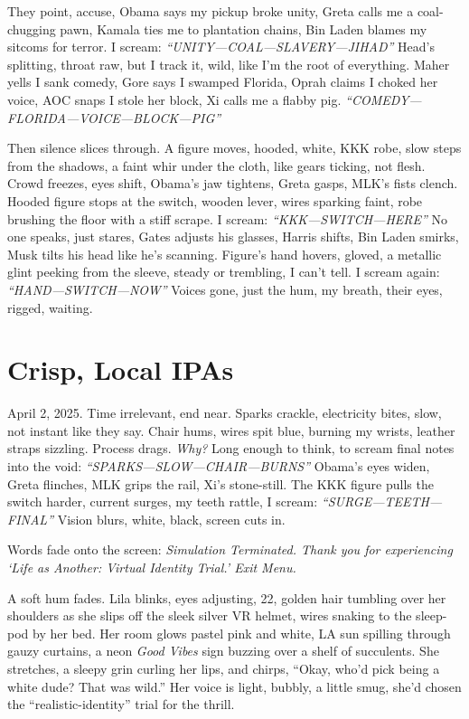 \documentclass[12pt]{article} %
\begin{document}
They point, accuse, \textnormal{Obama} says my pickup broke unity, \textnormal{Greta} calls me a coal-chugging pawn, \textnormal{Kamala} ties me to plantation chains, \textnormal{Bin Laden} blames my sitcoms for terror. I scream: \textit{“UNITY—COAL—SLAVERY—JIHAD”} Head’s splitting, throat raw, but I track it, wild, like I’m the root of everything. \textnormal{Maher} yells I sank comedy, \textnormal{Gore} says I swamped Florida, \textnormal{Oprah} claims I choked her voice, \textnormal{AOC} snaps I stole her block, \textnormal{Xi} calls me a flabby pig. \textit{“COMEDY—FLORIDA—VOICE—BLOCK—PIG”}

Then silence slices through. A figure moves, hooded, white, KKK robe, slow steps from the shadows, a faint whir under the cloth, like gears ticking, not flesh. Crowd freezes, eyes shift, \textnormal{Obama}’s jaw tightens, \textnormal{Greta} gasps, \textnormal{MLK}’s fists clench. Hooded figure stops at the switch, wooden lever, wires sparking faint, robe brushing the floor with a stiff scrape. I scream: \textit{“KKK—SWITCH—HERE”} No one speaks, just stares, \textnormal{Gates} adjusts his glasses, \textnormal{Harris} shifts, \textnormal{Bin Laden} smirks, \textnormal{Musk} tilts his head like he’s scanning. Figure’s hand hovers, gloved, a metallic glint peeking from the sleeve, steady or trembling, I can’t tell. I scream again: \textit{“HAND—SWITCH—NOW”} Voices gone, just the hum, my breath, their eyes, rigged, waiting.

\section{Crisp, Local IPAs}

April 2, 2025. Time irrelevant, end near. Sparks crackle, electricity bites, slow, not instant like they say. Chair hums, wires spit blue, burning my wrists, leather straps sizzling. Process drags. \textit{Why?} Long enough to think, to scream final notes into the void: \textit{“SPARKS—SLOW—CHAIR—BURNS”} \textnormal{Obama}’s eyes widen, \textnormal{Greta} flinches, \textnormal{MLK} grips the rail, \textnormal{Xi}’s stone-still. The KKK figure pulls the switch harder, current surges, my teeth rattle, I scream: \textit{“SURGE—TEETH—FINAL”} Vision blurs, white, black, screen cuts in.

Words fade onto the screen: \textit{Simulation Terminated. Thank you for experiencing ‘Life as Another: Virtual Identity Trial.’ Exit Menu.}

A soft hum fades. \textnormal{Lila} blinks, eyes adjusting, 22, golden hair tumbling over her shoulders as she slips off the sleek silver VR helmet, wires snaking to the sleep-pod by her bed. Her room glows pastel pink and white, LA sun spilling through gauzy curtains, a neon \textit{Good Vibes} sign buzzing over a shelf of succulents. She stretches, a sleepy grin curling her lips, and chirps, “Okay, who’d pick being a white dude? That was wild.” Her voice is light, bubbly, a little smug, she’d chosen the “realistic-identity” trial for the thrill.
\end{document}
